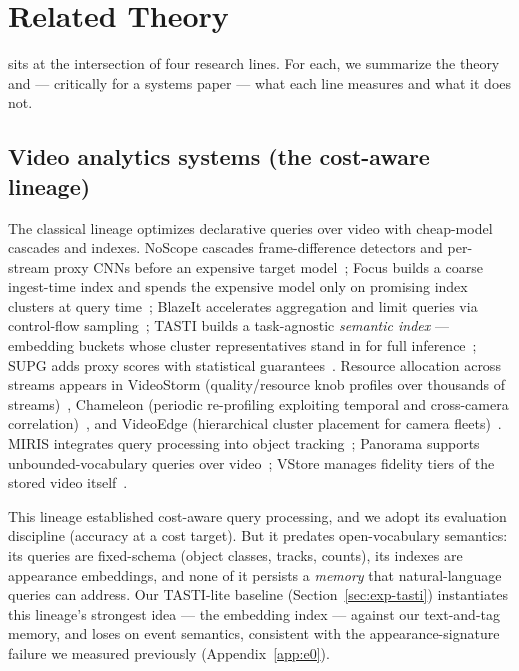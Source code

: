 \section{Related Theory}
\label{sec:related}

\sys sits at the intersection of four research lines. For each, we summarize the theory and --- critically for a systems paper --- what each line measures and what it does not.

\subsection{Video analytics systems (the cost-aware lineage)}
\label{sec:related-vas}

The classical lineage optimizes declarative queries over video with cheap-model cascades and indexes. NoScope cascades frame-difference detectors and per-stream proxy CNNs before an expensive target model~\cite{noscope}; Focus builds a coarse ingest-time index and spends the expensive model only on promising index clusters at query time~\cite{focus}; BlazeIt accelerates aggregation and limit queries via control-flow sampling~\cite{blazeit}; TASTI builds a task-agnostic \emph{semantic index} --- embedding buckets whose cluster representatives stand in for full inference~\cite{tasti}; SUPG adds proxy scores with statistical guarantees~\cite{supg}. Resource allocation across streams appears in VideoStorm (quality/resource knob profiles over thousands of streams)~\cite{videostorm}, Chameleon (periodic re-profiling exploiting temporal and cross-camera correlation)~\cite{chameleon}, and VideoEdge (hierarchical cluster placement for camera fleets)~\cite{videoedge}. MIRIS integrates query processing into object tracking~\cite{miris}; Panorama supports unbounded-vocabulary queries over video~\cite{panorama}; VStore manages fidelity tiers of the stored video itself~\cite{vstore}.

This lineage established cost-aware query processing, and we adopt its evaluation discipline (accuracy at a cost target). But it predates open-vocabulary semantics: its queries are fixed-schema (object classes, tracks, counts), its indexes are appearance embeddings, and none of it persists a \emph{memory} that natural-language queries can address. Our TASTI-lite baseline (Section~\ref{sec:exp-tasti}) instantiates this lineage's strongest idea --- the embedding index --- against our text-and-tag memory, and loses on event semantics, consistent with the appearance-signature failure we measured previously (Appendix~\ref{app:e0}).

